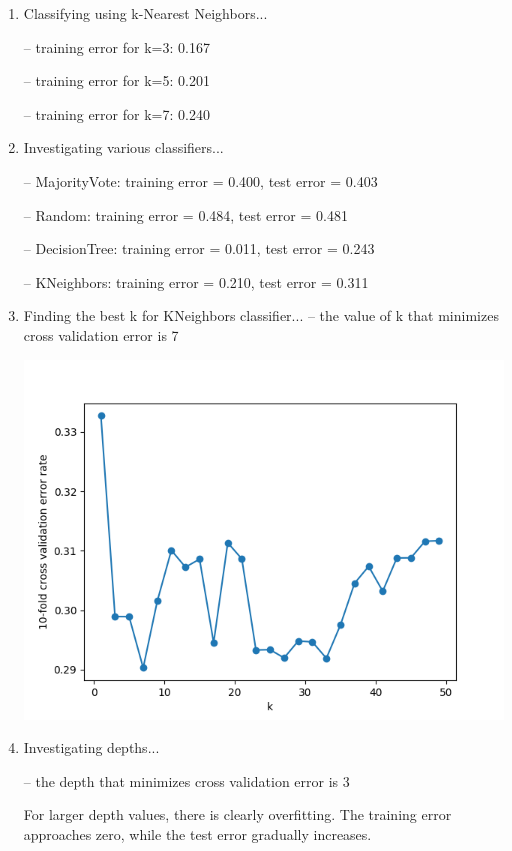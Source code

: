 \documentclass[11pt]{article}
\newcommand{\solution}[1]{{{\color{black}{\bf Solution:} {#1}}}}
\begin{document}
\begin{enumerate}
\item %
\solution{

Classifying using k-Nearest Neighbors...

	-- training error for k=3: 0.167
	
	-- training error for k=5: 0.201
	
	-- training error for k=7: 0.240
}
\vspace{0.5cm}

\item %
\solution{
Investigating various classifiers...

	-- MajorityVote: training error = 0.400, test error = 0.403
	
	-- Random:       training error = 0.484, test error = 0.481
	
	-- DecisionTree: training error = 0.011, test error = 0.243
	
	-- KNeighbors:   training error = 0.210, test error = 0.311
}

\newpage
\item %
\solution{
Finding the best k for KNeighbors classifier...
	-- the value of k that minimizes cross validation error is 7
}

\includegraphics[width=\linewidth]{KNN-CV.png}

\newpage
\item %
\solution{
Investigating depths...

	-- the depth that minimizes cross validation error is 3
	
For larger depth values, there is clearly overfitting. The training error approaches zero, while the test error gradually increases.
}


\end{enumerate}
\end{document}
